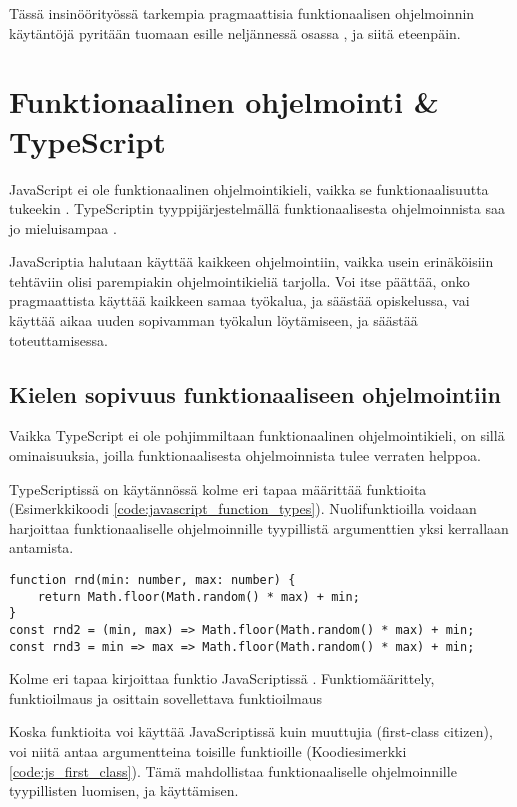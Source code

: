Tässä insinöörityössä tarkempia pragmaattisia funktionaalisen ohjelmoinnin käytäntöjä pyritään tuomaan esille neljännessä osassa , ja siitä eteenpäin.

\section{Funktionaalinen ohjelmointi \& TypeScript}
JavaScript ei ole funktionaalinen ohjelmointikieli, vaikka se funktionaalisuutta tukeekin \cite{is_reduce_bad}. TypeScriptin tyyppijärjestelmällä funktionaalisesta ohjelmoinnista saa jo mieluisampaa \cite{holvikari2021category}.

JavaScriptia halutaan käyttää kaikkeen ohjelmointiin, vaikka usein erinäköisiin tehtäviin olisi parempiakin ohjelmointikieliä tarjolla. Voi itse päättää, onko pragmaattista käyttää kaikkeen samaa työkalua, ja säästää opiskelussa, vai käyttää aikaa uuden sopivamman työkalun löytämiseen, ja säästää toteuttamisessa.


\subsection{Kielen sopivuus funktionaaliseen ohjelmointiin}

Vaikka TypeScript ei ole pohjimmiltaan funktionaalinen ohjelmointikieli, on sillä ominaisuuksia, joilla funktionaalisesta ohjelmoinnista tulee verraten helppoa.

TypeScriptissä on käytännössä kolme eri tapaa määrittää funktioita (Esimerkkikoodi \ref{code:javascript_function_types}). Nuolifunktioilla voidaan harjoittaa funktionaaliselle ohjelmoinnille tyypillistä argumenttien yksi kerrallaan antamista.


\begin{code}
    \begin{verbatim}
function rnd(min: number, max: number) { 
	return Math.floor(Math.random() * max) + min;
}
const rnd2 = (min, max) => Math.floor(Math.random() * max) + min;
const rnd3 = min => max => Math.floor(Math.random() * max) + min;
\end{verbatim}
    \caption{Kolme eri tapaa kirjoittaa funktio JavaScriptissä \cite{okhravi-g-discussion}. Funktiomäärittely, funktioilmaus ja osittain sovellettava funktioilmaus}
    \label{code:javascript_function_types}
\end{code}

Koska funktioita voi käyttää JavaScriptissä kuin muuttujia (first-class citizen), voi niitä antaa argumentteina toisille funktioille (Koodiesimerkki \ref{code:js_first_class}). Tämä mahdollistaa funktionaaliselle ohjelmoinnille tyypillisten  luomisen, ja käyttämisen.

